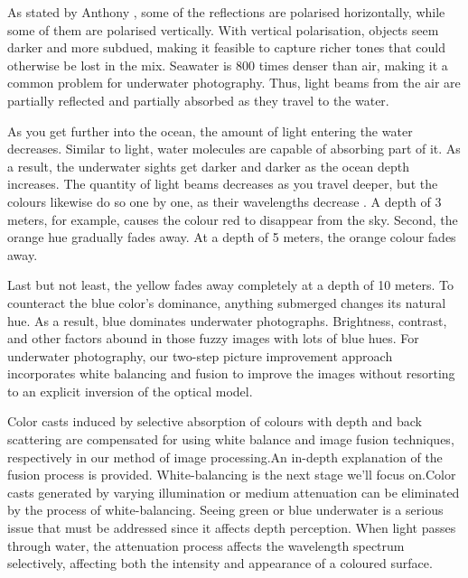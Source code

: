 \documentclass[conference]{IEEEtran}
\begin{document}
As stated by Anthony \cite{Seafriends}, some of the reflections are polarised horizontally, while some of them are polarised vertically. With vertical polarisation, objects seem darker and more subdued, making it feasible to capture richer tones that could otherwise be lost in the mix. Seawater is 800 times denser than air, making it a common problem for underwater photography. Thus, light beams from the air are partially reflected and partially absorbed \cite{Seafriends} as they travel to the water.\\
\par
As you get further into the ocean, the amount of light entering the water decreases. Similar to light, water molecules are capable of absorbing part of it. As a result, the underwater sights get darker and darker as the ocean depth increases. The quantity of light beams decreases as you travel deeper, but the colours likewise do so one by one, as their wavelengths decrease \cite{b1}. A depth of 3 meters, for example, causes the colour red to disappear from the sky. Second, the orange hue gradually fades away. At a depth of 5 meters, the orange colour fades away.\\ 
\par
Last but not least, the yellow fades away completely at a depth of 10 meters. \cite{b1} \cite{Seafriends}
To counteract the blue color's dominance, anything submerged changes its natural hue. As a result, blue dominates underwater photographs. Brightness, contrast, and other factors abound in those fuzzy images with lots of blue hues. For underwater photography, our two-step picture improvement approach incorporates white balancing and fusion to improve the images without resorting to an explicit inversion of the optical model. \\
\par
Color casts induced by selective absorption of colours with depth and back scattering are compensated for using white balance and image fusion techniques, respectively in our method of image processing.An in-depth explanation of the fusion process is provided. White-balancing is the next stage we'll focus on.Color casts generated by varying illumination or medium attenuation can be eliminated by the process of white-balancing. Seeing green or blue underwater is a serious issue that must be addressed since it affects depth perception. When light passes through water, the attenuation process affects the wavelength spectrum selectively, affecting both the intensity and appearance of a coloured surface. \\
\end{document}
